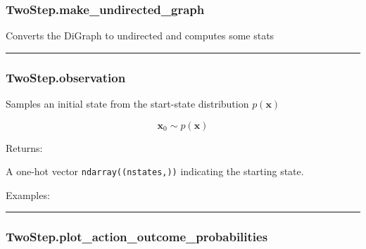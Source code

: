 \hypertarget{twostep.make_undirected_graph}{%
\subsubsection{TwoStep.make\_undirected\_graph}\label{twostep.make_undirected_graph}}

\begin{Shaded}
\begin{Highlighting}[]
\NormalTok{)}
\end{Highlighting}
\end{Shaded}

Converts the DiGraph to undirected and computes some stats

\begin{center}\rule{0.5\linewidth}{\linethickness}\end{center}

\hypertarget{twostep.observation}{%
\subsubsection{TwoStep.observation}\label{twostep.observation}}

\begin{Shaded}
\begin{Highlighting}[]
\NormalTok{)}
\end{Highlighting}
\end{Shaded}

Samples an initial state from the start-state distribution
\(p(\mathbf x)\)

\[
\mathbf x_0 \sim p(\mathbf x)
\]

Returns:

A one-hot vector \texttt{ndarray((nstates,))} indicating the starting
state.

Examples:

\begin{Shaded}
\begin{Highlighting}[]
\OperatorTok{=}
\end{Highlighting}
\end{Shaded}

\begin{center}\rule{0.5\linewidth}{\linethickness}\end{center}

\hypertarget{twostep.plot_action_outcome_probabilities}{%
\subsubsection{TwoStep.plot\_action\_outcome\_probabilities}\label{twostep.plot_action_outcome_probabilities}}

